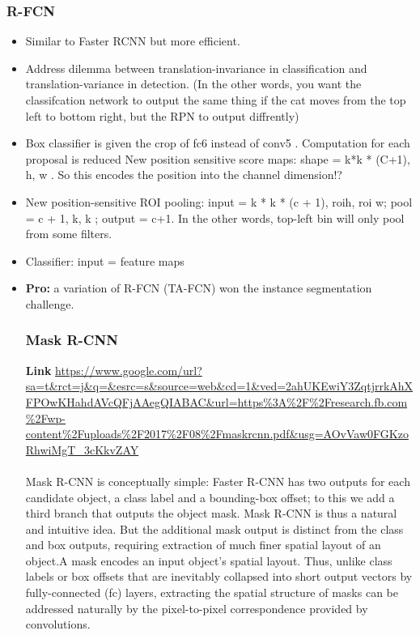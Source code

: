 \documentclass[11pt]{article}
\begin{document}
\begin{enumerate}
\subsubsection{R-FCN}
\begin{itemize}
    \item     Similar to Faster RCNN but more efficient.
    \item Address dilemma between translation-invariance in classification and translation-variance in detection. (In the other words, you want the classifcation network to output the same thing if the cat moves from the top left to bottom right, but the RPN to output diffrently)
    \item Box classifier is given the crop of fc6 instead of conv5 . Computation for each proposal is reduced
    New position sensitive score maps: shape = k*k * (C+1), h, w . So this encodes the position into the channel dimension!?
    \item New position-sensitive ROI pooling: input = k * k * (c + 1), roi\textunderscore h, roi \textunderscore w; pool = c + 1, k, k ; output = c+1. In the other words, top-left bin will only pool from some filters.
    \item Classifier: input = feature maps
    \item   \textbf{Pro: } a variation of R-FCN (TA-FCN) won the instance segmentation challenge.
    \clearpage
\subsubsection{Mask R-CNN}
\textbf{Link}
\url{https://www.google.com/url?sa=t&rct=j&q=&esrc=s&source=web&cd=1&ved=2ahUKEwiY3ZqtjrrkAhXFPOwKHahdAVcQFjAAegQIABAC&url=https\%3A\%2F\%2Fresearch.fb.com\%2Fwp-content\%2Fuploads\%2F2017\%2F08\%2Fmaskrcnn.pdf&usg=AOvVaw0FGKzoRhwiMgT_3cKkvZAY}\\\\
Mask R-CNN is conceptually simple: Faster R-CNN has
two outputs for each candidate object, a class label and a
bounding-box offset; to this we add a third branch that outputs
the object mask. Mask R-CNN is thus a natural and intuitive
idea. But the additional mask output is distinct from
the class and box outputs, requiring extraction of much finer
spatial layout of an object.A mask encodes an input object’s
spatial layout. Thus, unlike class labels or box offsets
that are inevitably collapsed into short output vectors by
fully-connected (fc) layers, extracting the spatial structure
of masks can be addressed naturally by the pixel-to-pixel
correspondence provided by convolutions.
\end{itemize}{}
   

\end{enumerate}
\end{document}
